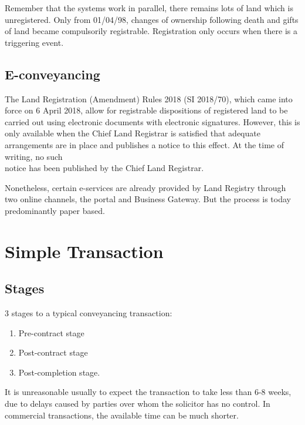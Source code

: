 \documentclass[
]{article}
\providecommand{\tightlist}{%
  \setlength{\itemsep}{0pt}\setlength{\parskip}{0pt}}
\begin{document}
Remember that the systems work in parallel, there remains lots of land
which is unregistered. Only from 01/04/98, changes of ownership
following death and gifts of land became compulsorily registrable.
Registration only occurs when there is a triggering event.

\hypertarget{e-conveyancing}{%
\subsection{E-conveyancing}\label{e-conveyancing}}

The Land Registration (Amendment) Rules 2018 (SI 2018/70), which came
into force on 6 April 2018, allow for registrable dispositions of
registered land to be carried out using electronic documents with
electronic signatures. However, this is only available when the Chief
Land Registrar is satisfied that adequate arrangements are in place and
publishes a notice to this effect. At the time of writing, no such\\
notice has been published by the Chief Land Registrar.

Nonetheless, certain e-services are already provided by Land Registry
through two online channels, the portal and Business Gateway. But the
process is today predominantly paper based.

\hypertarget{simple-transaction}{%
\section{Simple Transaction}\label{simple-transaction}}

\hypertarget{stages}{%
\subsection{Stages}\label{stages}}

3 stages to a typical conveyancing transaction:

\begin{enumerate}
\def\labelenumi{\arabic{enumi}.}
\tightlist
\item
  Pre-contract stage
\item
  Post-contract stage
\item
  Post-completion stage.
\end{enumerate}

It is unreasonable usually to expect the transaction to take less than
6-8 weeks, due to delays caused by parties over whom the solicitor has
no control. In commercial transactions, the available time can be much
shorter.
\end{document}
